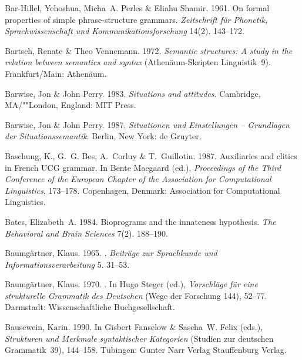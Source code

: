 \begin{thebibliography}{1420}
Bar-Hillel, Yehoshua, Micha~A. Perles \& Eliahu Shamir. 1961.
\newblock On formal properties of simple phrase-structure grammars.
\newblock \emph{Zeitschrift f{\"u}r Phonetik, Sprachwissenschaft und
  Kommunikationsforschung} 14(2). 143--172.

Bartsch, Renate \& Theo Vennemann. 1972.
\newblock \emph{Semantic structures: {A} study in the relation between
  semantics and syntax} (Athen{\"a}um-Skripten Linguistik~9).
\newblock Frankfurt/Main: Athen{\"a}um.

Barwise, Jon \& John Perry. 1983.
\newblock \emph{Situations and attitudes}.
\newblock Cambridge, MA/""London, England: MIT Press.

Barwise, Jon \& John Perry. 1987.
\newblock \emph{{Situationen und Einstellungen -- Grundlagen der
  Situationssemantik}}.
\newblock Berlin, New York: de Gruyter.

Baschung, K., G.~G. Bes, A.~Corluy \& T.~Guillotin. 1987.
\newblock Auxiliaries and clitics in {French} {UCG} grammar.
\newblock In Bente Maegaard (ed.), \emph{Proceedings of the {Third Conference
  of the European Chapter of the Association for Computational Linguistics}},
  173--178. Copenhagen, Denmark: Association for Computational Linguistics.

Bates, Elizabeth~A. 1984.
\newblock Bioprograms and the innateness hypothesis.
\newblock \emph{The Behavioral and Brain Sciences} 7(2). 188--190.

Baumg{\"a}rtner, Klaus. 1965.
.
\newblock \emph{Beitr{\"a}ge zur Sprachkunde und Informationsverarbeitung} 5.
  31--53.

Baumg{\"a}rtner, Klaus. 1970.
.
\newblock In Hugo Steger (ed.), \emph{{Vorschl{\"a}ge f{\"u}r eine strukturelle
  Grammatik des Deutschen}} (Wege der Forschung 144), 52--77. Darmstadt:
  Wissenschaftliche Buchgesellschaft.

Bausewein, Karin. 1990.
\newblock In Gisbert Fanselow \& Sascha~W. Felix (eds.), \emph{{Strukturen und
  Merkmale syntaktischer Kategorien}} (Studien zur deutschen Grammatik~39),
  144--158. T{\"u}bingen: \original Gunter Narr Verlag \jetzt Stauffenburg
  Verlag.


\end{thebibliography}
